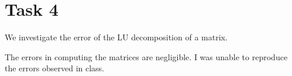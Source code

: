 \section{Task 4}
We investigate the error of the LU decomposition of a matrix.

\begin{center}
\end{center}

\noindent
The errors in computing the matrices are negligible. I was unable to reproduce the errors observed in class.

